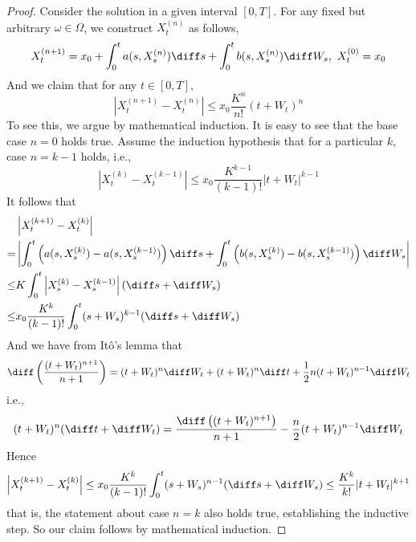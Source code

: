     \begin{proof}
        Consider the solution in a given interval $[0,T]$.
        For any fixed but arbitrary $\omega\in\Omega$,
        we construct $X_t^{(n)}$ as follows,
        \begin{equation}
            \label{eq:induction formula}
            X_t^{(n+1)}=x_0+\int_0^ta(s,X_s^{(n)})\diff s
            +\int_0^tb(s,X_s^{(n)})\diff W_s,
            \ X_t^{(0)}=x_0
        \end{equation}
        And we claim that for any $t\in[0,T]$,
        \[\left|X_t^{(n+1)}-X_t^{(n)}\right|
        \leq x_0\frac{K^n}{n!}(t+W_t)^{n}\]
        To see this,
        we argue by mathematical induction.
        It is easy to see that the base case $n=0$ holds true.
        Assume the induction hypothesis that for a particular
        $k$, case $n=k-1$ holds, i.e.,
        \[\left|X_t^{(k)}-X_t^{(k-1)}\right|
        \leq x_0\frac{K^{k-1}}{(k-1)!}|t+W_t|^{k-1}\]
        It follows that
        \[\begin{aligned}
            &\left|X_t^{(k+1)}-X_t^{(k)}\right|\\
            =&\left|\int_0^t\left(a(s,X_s^{(k)})-a(s,X_s^{(k-1)})\right)\diff s
            +\int_0^t\left(b(s,X_s^{(k)})-b(s,X_s^{(k-1)})\right)\diff W_s\right|\\
            \leq&K\int_0^t\left|X_s^{(k)}-X_s^{(k-1)}\right|(\diff s+\diff W_s)\\
            \leq&x_0\frac{K^k}{(k-1)!}\int_0^t(s+W_s)^{k-1}(\diff s+\diff W_s)
        \end{aligned}\]
        And we have from It\^o's lemma that
        \[\diff\left(\frac{(t+W_t)^{n+1}}{n+1}\right)
        =(t+W_t)^n\diff W_t+(t+W_t)^n\diff t+\frac{1}{2}n(t+W_t)^{n-1}\diff W_t\]
        i.e.,
        \[(t+W_t)^n(\diff t+\diff W_t)
        =\frac{\diff\left((t+W_t)^{n+1}\right)}{n+1}
        -\frac{n}{2}(t+W_t)^{n-1}\diff W_t\]
        Hence
        \[\left|X_t^{(k+1)}-X_t^{(k)}\right|\leq
        x_0\frac{K^k}{(k-1)!}\int_0^t(s+W_s)^{n-1}(\diff s+\diff W_s)
        \leq\frac{K^k}{k!}|t+W_t|^{k+1}\]
        that is, the statement about case $n=k$ also holds true,
        establishing the inductive step. So our claim follows by
        mathematical induction.


\end{proof}
